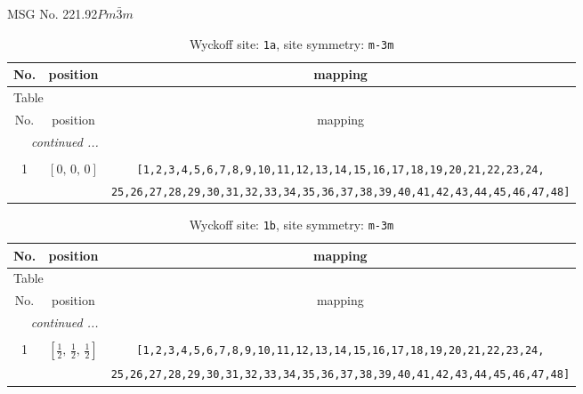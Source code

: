 \documentclass[fleqn,8pt]{jsarticle}
\begin{document}
\setcounter{MaxMatrixCols}{32}

\renewcommand{\tablename}{Table~}
\renewcommand{\figurename}{Figure~}
\begin{center}
\LARGE
MSG No. 221.92\quad$Pm\bar{3}m$
\end{center}
\renewcommand{\arraystretch}{1.2}
\begin{longtable}{ccc}
\caption{Wyckoff site: {\tt 1a}, site symmetry: {\tt m-3m}}
 \\
 \hline \hline
No. & position & mapping \\ \hline \endfirsthead

\multicolumn{2}{l}{\tablename\ \thetable{}} \\
 \hline \hline
No. & position & mapping \\ \hline \endhead

 \hline \hline
\multicolumn{2}{r}{\footnotesize\it continued ...} \\ \endfoot

 \hline \hline
\multicolumn{2}{r}{} \\ \endlastfoot

1 & $\left[ 0,\, 0,\, 0 \right]$ & {\tt [1,2,3,4,5,6,7,8,9,10,11,12,13,14,15,16,17,18,19,20,21,22,23,24,} \\ \hline
 &  & {\tt 25,26,27,28,29,30,31,32,33,34,35,36,37,38,39,40,41,42,43,44,45,46,47,48]} \\
\end{longtable}
\renewcommand{\arraystretch}{1.2}
\begin{longtable}{ccc}
\caption{Wyckoff site: {\tt 1b}, site symmetry: {\tt m-3m}}
 \\
 \hline \hline
No. & position & mapping \\ \hline \endfirsthead

\multicolumn{2}{l}{\tablename\ \thetable{}} \\
 \hline \hline
No. & position & mapping \\ \hline \endhead

 \hline \hline
\multicolumn{2}{r}{\footnotesize\it continued ...} \\ \endfoot

 \hline \hline
\multicolumn{2}{r}{} \\ \endlastfoot

1 & $\left[ \frac{1}{2},\, \frac{1}{2},\, \frac{1}{2} \right]$ & {\tt [1,2,3,4,5,6,7,8,9,10,11,12,13,14,15,16,17,18,19,20,21,22,23,24,} \\ \hline
 &  & {\tt 25,26,27,28,29,30,31,32,33,34,35,36,37,38,39,40,41,42,43,44,45,46,47,48]} \\
\end{longtable}
\end{document}

